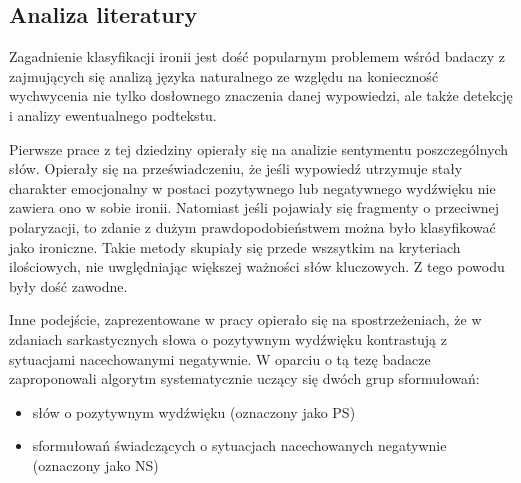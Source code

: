\subsection{Analiza literatury}

Zagadnienie klasyfikacji ironii jest dość popularnym problemem wśród badaczy z zajmujących się analizą języka naturalnego ze względu na konieczność wychwycenia nie tylko dosłownego znaczenia danej wypowiedzi, ale także detekcję i analizy ewentualnego podtekstu.


Pierwsze prace z tej dziedziny opierały się na analizie sentymentu poszczególnych słów. Opierały się na przeświadczeniu, że jeśli wypowiedź utrzymuje stały charakter emocjonalny w postaci pozytywnego lub negatywnego wydźwięku    nie zawiera ono w sobie ironii. Natomiast jeśli pojawiały się fragmenty o przeciwnej polaryzacji, to zdanie z dużym prawdopodobieństwem można było klasyfikować jako ironiczne. Takie metody skupiały się przede wszsytkim na kryteriach ilościowych, nie uwględniając większej ważności słów kluczowych. Z tego powodu były dość zawodne.





Inne podejście, zaprezentowane w pracy \cite{Riloff2013} opierało się na spostrzeżeniach, że w zdaniach sarkastycznych słowa o pozytywnym wydźwięku kontrastują z sytuacjami nacechowanymi negatywnie. W oparciu o tą tezę badacze zaproponowali algorytm systematycznie uczący się dwóch grup sformułowań:

\begin{itemize}
    \item słów o pozytywnym wydźwięku (oznaczony jako PS)
    \item sformułowań świadczących o sytuacjach nacechowanych negatywnie (oznaczony jako NS)
\end{itemize}


